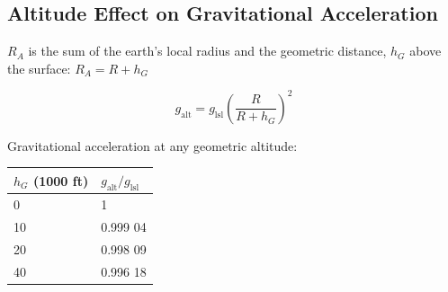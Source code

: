 \documentclass[
]{book}
\begin{document}
\hypertarget{altitude-effect-on-gravitational-acceleration}{%
\subsection*{Altitude Effect on Gravitational Acceleration}\label{altitude-effect-on-gravitational-acceleration}}

\(R_A\) is the sum of the earth's local radius and the geometric distance, \(h_G\) above the surface: \(R_A = R + h_G\)

\[
g_{\mathrm{alt}} = g_{\mathrm{lsl}}\left( \frac{R}{R + h_G} \right)^2
\]

Gravitational acceleration at any geometric altitude:

\begin{longtable}[]{@{}ll@{}}
\toprule
\begin{minipage}[b]{0.16\columnwidth}\raggedright
\(h_G\)
(1000 ft)\strut
\end{minipage} & \begin{minipage}[b]{0.26\columnwidth}\raggedright
\(g_{\mathrm{alt}}/g_{\mathrm{lsl}}\)\strut
\end{minipage}\tabularnewline
\midrule
\endhead
\begin{minipage}[t]{0.16\columnwidth}\raggedright
0\strut
\end{minipage} & \begin{minipage}[t]{0.26\columnwidth}\raggedright
1\strut
\end{minipage}\tabularnewline
\begin{minipage}[t]{0.16\columnwidth}\raggedright
10\strut
\end{minipage} & \begin{minipage}[t]{0.26\columnwidth}\raggedright
0.999 04\strut
\end{minipage}\tabularnewline
\begin{minipage}[t]{0.16\columnwidth}\raggedright
20\strut
\end{minipage} & \begin{minipage}[t]{0.26\columnwidth}\raggedright
0.998 09\strut
\end{minipage}\tabularnewline
\begin{minipage}[t]{0.16\columnwidth}\raggedright
40\strut
\end{minipage} & \begin{minipage}[t]{0.26\columnwidth}\raggedright
0.996 18\strut
\end{minipage}\tabularnewline

\end{longtable}
\end{document}
